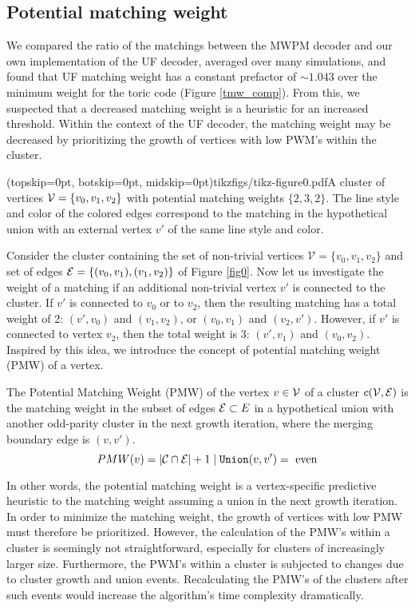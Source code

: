 \subsection{Potential matching weight}\label{sec:matchingweight}
We compared the ratio of the matchings between the MWPM decoder and our own implementation of the UF decoder, averaged over many simulations, and found that UF matching weight has a constant prefactor of $\sim 1.043$ over the minimum weight for the toric code (Figure \ref{tmw_comp}). From this, we suspected that a decreased matching weight is a heuristic for an increased threshold. Within the context of the UF decoder, the matching weight may be decreased by prioritizing the growth of vertices with low PWM's within the cluster. 

\Figure[htb](topskip=0pt, botskip=0pt, midskip=0pt){tikzfigs/tikz-figure0.pdf}{A cluster of vertices $\mathcal{V}=\{v_0, v_1, v_2\}$ with potential matching weights $\{2, 3, 2\}$. The line style and color of the colored edges correspond to the matching in the hypothetical union with an external vertex $v'$ of the same line style and color.\label{fig0}}

Consider the cluster containing the set of non-trivial vertices $\mathcal{V}=\{v_0,v_1,v_2\}$ and set of edges $\mathcal{E}=\{(v_0,v_1), (v_1, v_2)\}$ of Figure \ref{fig0}. Now let us investigate the weight of a matching if an additional non-trivial vertex $v'$ is connected to the cluster. If $v'$ is connected to $v_0$ or to $v_2$, then the resulting matching has a total weight of 2: $(v',v_0)$ and $(v_1,v_2)$, or $(v_0,v_1)$ and $(v_2,v')$. However, if $v'$ is connected to vertex $v_2$, then the total weight is 3: $(v', v_1)$ and $(v_0, v_2)$. Inspired by this idea, we introduce the concept of potential matching weight (PMW) of a vertex. 

\begin{definition}\label{def:pmw}
    The Potential Matching Weight (PMW) of the vertex $v\in \mathcal{V}$ of a cluster $c(\mathcal{V},\mathcal{E})$ is the matching weight in the subset of edges $\mathcal{E} \subset E$ in a hypothetical union with another odd-parity cluster in the next growth iteration, where the merging boundary edge is $(v,v')$. 
    \begin{equation}
      PMW(v) = \lvert\mathcal{C} \cap \mathcal{E}\rvert + 1 \mid \texttt{Union}(v, v') = \text{ even}
    \end{equation}
\end{definition}
In other words, the potential matching weight is a vertex-specific predictive heuristic to the matching weight assuming a union in the next growth iteration. In order to minimize the matching weight, the growth of vertices with low PMW must therefore be prioritized. However, the calculation of the PMW's within a cluster is seemingly not straightforward, especially for clusters of increasingly larger size. Furthermore, the PWM's within a cluster is subjected to changes due to cluster growth and union events. Recalculating the PMW's of the clusters after such events would increase the algorithm's time complexity dramatically. 
